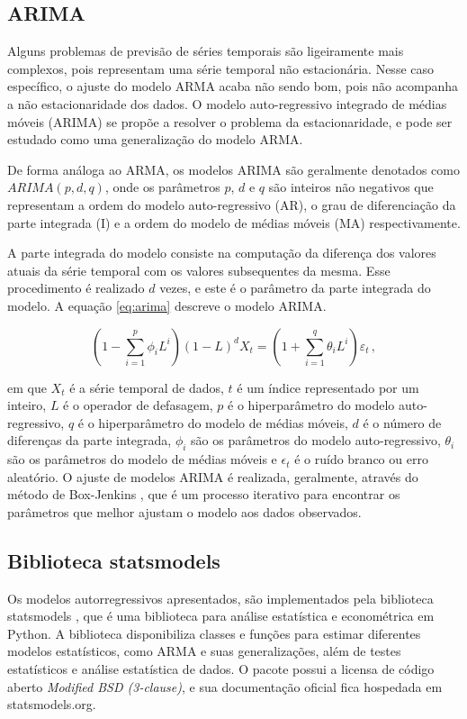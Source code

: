 \subsection{ARIMA}
Alguns problemas de previsão de séries temporais são ligeiramente mais complexos, pois representam uma série temporal não estacionária. Nesse caso específico, o ajuste do modelo ARMA acaba não sendo bom, pois não acompanha a não estacionaridade dos dados. O modelo auto-regressivo integrado de médias móveis (ARIMA) se propõe a resolver o problema da estacionaridade, e pode ser estudado como uma generalização do modelo ARMA.

De forma análoga ao ARMA, os modelos ARIMA são geralmente denotados como $ARIMA(p, d, q)$, onde os parâmetros $p$, $d$ e $q$ são inteiros não negativos que representam a ordem do modelo auto-regressivo (AR), o grau de diferenciação da parte integrada (I) e a ordem do modelo de médias móveis (MA) respectivamente.

A parte integrada do modelo consiste na computação da diferença dos valores atuais da série temporal com os valores subsequentes da mesma. Esse procedimento é realizado $d$ vezes, e este é o parâmetro da parte integrada do modelo. A equação \eqref{eq:arima} descreve o modelo ARIMA.

\begin{equation}\label{eq:arima}
    \left(1-\sum_{i=1}^{p} \phi_{i} L^{i}\right)(1-L)^{d} X_{t}=\left(1+\sum_{i=1}^{q} \theta_{i} L^{i}\right) \varepsilon_{t}\, ,
\end{equation}

em que $X_{t}$ é a série temporal de dados, $t$ é um índice representado por um inteiro, $L$ é o operador de defasagem, $p$ é o hiperparâmetro do modelo auto-regressivo, $q$ é o hiperparâmetro do modelo de médias móveis, $d$ é o número de diferenças da parte integrada, $\phi_{i}$ são os parâmetros do modelo auto-regressivo, $\theta_{i}$ são os parâmetros do modelo de médias móveis e $\epsilon_{t}$ é o ruído branco ou erro aleatório. O ajuste de modelos ARIMA é realizada, geralmente, através do método de Box-Jenkins \cite{box&jenkins}, que é um processo iterativo para encontrar os parâmetros que melhor ajustam o modelo aos dados observados.

\subsection{Biblioteca statsmodels}
Os modelos autorregressivos apresentados, são implementados pela biblioteca statsmodels \cite{seabold2010statsmodels}, que é uma biblioteca para análise estatística e econométrica em Python. A biblioteca disponibiliza classes e funções para estimar diferentes modelos estatísticos, como ARMA e suas generalizações, além de testes estatísticos e análise estatística de dados. O pacote possui a licensa de código aberto \textit{Modified BSD (3-clause)}, e sua documentação oficial fica hospedada em statsmodels.org.


